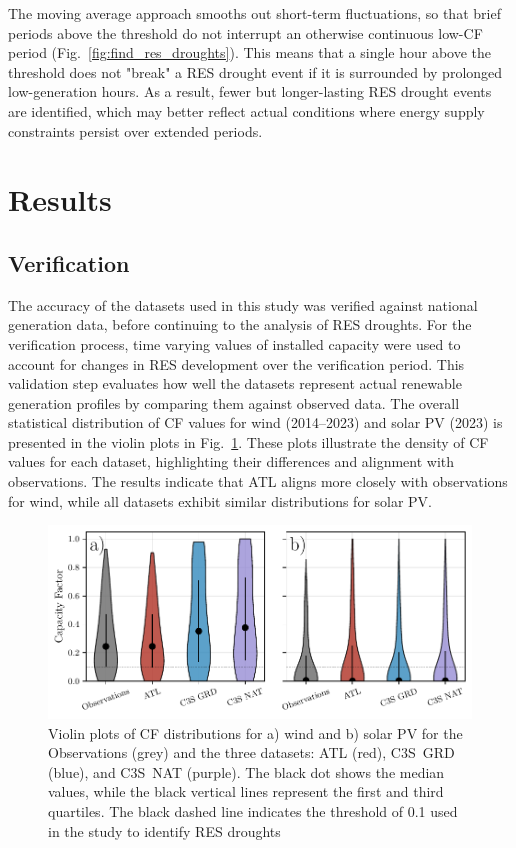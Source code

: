 \documentclass[preprint, 12pt]{elsarticle}
\begin{document}
The moving average approach smooths out short-term fluctuations, so that brief periods above the threshold do not interrupt an otherwise continuous low-CF period (Fig.~\ref{fig:find_res_droughts}). This means that a single hour above the threshold does not "break" a RES drought event if it is surrounded by prolonged low-generation hours. As a result, fewer but longer-lasting RES drought events are identified, which may better reflect actual conditions where energy supply constraints persist over extended periods.

\section{Results}
\label{sec:results}

\subsection{Verification}
\label{sec:verification}

The accuracy of the datasets used in this study was verified against national generation data, before continuing to the analysis of RES droughts. For the verification process, time varying values of installed capacity were used to account for changes in RES development over the verification period. This validation step evaluates how well the datasets represent actual renewable generation profiles by comparing them against observed data. The overall statistical distribution of CF values for wind (2014–2023) and solar PV (2023) is presented in the violin plots in Fig.~\ref{fig:violin_plots}. These plots illustrate the density of CF values for each dataset, highlighting their differences and alignment with observations. The results indicate that ATL aligns more closely with observations for wind, while all datasets exhibit similar distributions for solar PV.

\begin{figure}[ht!]
	\centering
	\includegraphics[width=\textwidth]{violin_plots_verification.pdf}
	\caption{Violin plots of CF distributions for a)  wind and b) solar PV for the Observations (grey) and the three datasets: ATL (red), C3S~GRD (blue), and C3S~NAT (purple). The black dot shows the median values, while the black vertical lines represent the first and third quartiles. The black dashed line indicates the threshold of 0.1 used in the study to identify RES droughts}
	\label{fig:violin_plots}
\end{figure}
\end{document}
